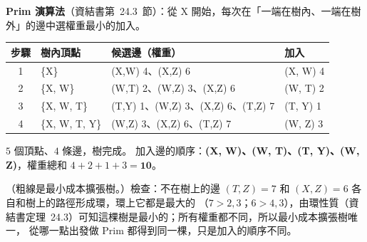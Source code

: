\begin{pastsoln}
\textbf{Prim 演算法}（資結書第~24.3~節）：從 X 開始，每次在「一端在樹內、一端在樹外」的邊中選權重最小的加入。
\begin{center}
\small
\begin{tabular}{clll}
\toprule
步驟 & 樹內頂點 & 候選邊（權重） & 加入 \\
\midrule
1 & \{X\} & (X,W) 4、(X,Z) 6 & (X, W) 4 \\
2 & \{X, W\} & (W,T) 2、(W,Z) 3、(X,Z) 6 & (W, T) 2 \\
3 & \{X, W, T\} & (T,Y) 1、(W,Z) 3、(X,Z) 6、(T,Z) 7 & (T, Y) 1 \\
4 & \{X, W, T, Y\} & (W,Z) 3、(X,Z) 6、(T,Z) 7 & (W, Z) 3 \\
\bottomrule
\end{tabular}
\end{center}
$5$ 個頂點、$4$ 條邊，樹完成。 加入邊的順序：\textbf{(X, W)、(W, T)、(T, Y)、(W, Z)}，權重總和 $4 + 2 + 1 + 3 = \mathbf{10}$。
\begin{center}
\end{center}
（粗線是最小成本擴張樹。）檢查：不在樹上的邊 $(T,Z) = 7$ 和 $(X,Z) = 6$ 各自和樹上的路徑形成環，環上它都是最大的
（$7 > 2, 3$；$6 > 4, 3$），由環性質（資結書定理~24.3）可知這棵樹是最小的；所有權重都不同，所以最小成本擴張樹唯一，
從哪一點出發做 Prim 都得到同一棵，只是加入的順序不同。
\end{pastsoln}
